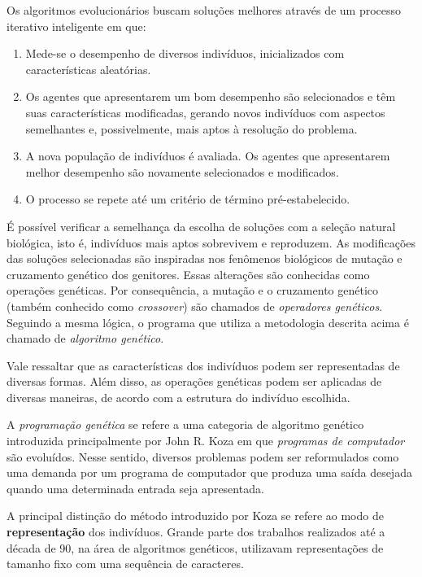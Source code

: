 Os algoritmos evolucionários buscam soluções melhores através de um processo iterativo inteligente em que:

\begin{enumerate}[label={\alph*)}]
\item Mede-se o desempenho de diversos indivíduos, inicializados com características aleatórias.
\item Os agentes que apresentarem um bom desempenho são selecionados e têm suas características modificadas, gerando novos indivíduos com aspectos semelhantes e, possivelmente, mais aptos à resolução do problema.
\item A nova população de indivíduos é avaliada. Os agentes que apresentarem melhor desempenho são novamente selecionados e modificados.
\item O processo se repete até um critério de término pré-estabelecido.
\end{enumerate}

É possível verificar a semelhança da escolha de soluções com a seleção natural biológica, isto é, indivíduos mais aptos sobrevivem e reproduzem. As modificações das soluções selecionadas são inspiradas nos fenômenos biológicos de mutação e cruzamento genético dos genitores. Essas alterações são conhecidas como operações genéticas. Por consequência, a mutação e o cruzamento genético (também conhecido como \textit{\textit{crossover}}) são chamados de \textit{operadores genéticos}. Seguindo a mesma lógica, o programa que utiliza a metodologia descrita acima é chamado de \textit{algoritmo genético}.

Vale ressaltar que as características dos indivíduos podem ser representadas de diversas formas. Além disso, as operações genéticas podem ser aplicadas de diversas maneiras, de acordo com a estrutura do indivíduo escolhida.

A \textit{programação genética} se refere a uma categoria de algoritmo genético introduzida principalmente por John R. Koza \cite{koza92bookGp} em que \textit{programas de computador} são evoluídos. Nesse sentido, diversos problemas podem ser reformulados como uma demanda por um programa de computador que produza uma saída desejada quando uma determinada entrada seja apresentada.

A principal distinção do método introduzido por Koza se refere ao modo de \textbf{representação} dos indivíduos. Grande parte dos trabalhos realizados até a década de 90, na área de algoritmos genéticos, utilizavam representações de tamanho fixo com uma sequência de caracteres.

